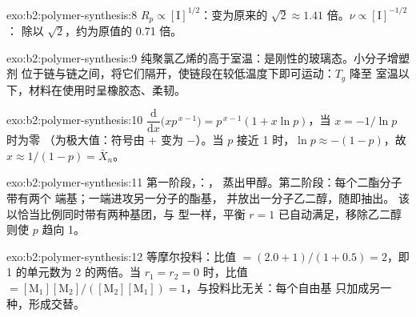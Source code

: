 \begin{solution}{exo:b2:polymer-synthesis:8}
$R_p \propto [\mathrm I]^{1/2}$：变为原来的 $\sqrt2 \approx 1.41$ 倍。$\nu \propto [\mathrm I]^{-1/2}$：
除以 $\sqrt 2$，约为原值的 0.71 倍。
\end{solution}

\begin{solution}{exo:b2:polymer-synthesis:9}
纯聚氯乙烯的高于室温：是刚性的玻璃态。小分子增塑剂
位于链与链之间，将它们隔开，使链段在较低温度下即可运动：$T_g$ 降至
室温以下，材料在使用时呈橡胶态、柔韧。
\end{solution}

\begin{solution}{exo:b2:polymer-synthesis:10}
$\dfrac{\mathrm d}{\mathrm dx}\bigl(x p^{\,x-1}\bigr) = p^{\,x-1}(1 + x\ln p)$，当 $x = -1/\ln p$ 时为零
（为极大值：符号由 $+$ 变为 $-$）。当 $p$ 接近 1 时，$\ln p \approx -(1-p)$，故 $x \approx
1/(1-p) = \bar X_n$。
\end{solution}

\begin{solution}{exo:b2:polymer-synthesis:11}
第一阶段，：，
蒸出甲醇。第二阶段：每个二酯分子带有两个  端基；一端进攻另一分子的酯基，
并放出一分子乙二醇，随即抽出。
该以恰当比例同时带有两种基团，与  型一样，平衡
$r = 1$ 已自动满足，移除乙二醇则使 $p$ 趋向 1。
\end{solution}

\begin{solution}{exo:b2:polymer-synthesis:12}
等摩尔投料：比值 $= (2.0 + 1)/(1 + 0.5) = 2$，即 1 的单元数为 2 的两倍。当 $r_1 = r_2 =
0$ 时，比值 $= [\mathrm M_1][\mathrm M_2]/([\mathrm M_2][\mathrm M_1]) = 1$，与投料比无关：每个自由基
只加成另一种，形成交替。
\end{solution}

